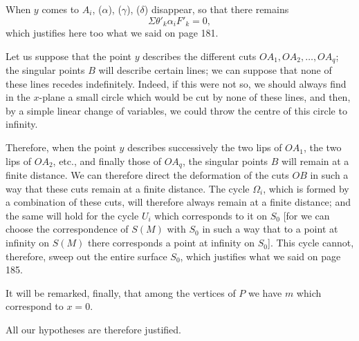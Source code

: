 \documentclass{article}
\begin{document}
When $y$ comes to $A_{i}$, ($\alpha$), ($\gamma$), ($\delta$) disappear, so that there remains
\[ \Sigma \theta'_{k} \alpha_{i}F'_{k} = 0, \]
which justifies here too what we said on page 181.

Let us suppose that the point $y$ describes the different cuts $OA_{1}, OA_{2}, \ldots, OA_{q}$; the singular points $B$ will describe certain lines; we can suppose that none of these lines recedes indefinitely. Indeed, if this were not so, we should always find in the $x$-plane a small circle which would be cut by none of these lines, and then, by a simple linear change of variables, we could throw the centre of this circle to infinity.

Therefore, when the point $y$ describes successively the two lips of $OA_{1}$, the two lips of $OA_{2}$, etc., and finally those of $OA_{q}$, the singular points $B$ will remain at a finite distance. We can therefore direct the deformation of the cuts $OB$ in such a way that these cuts remain at a finite distance. The cycle $\Omega_{i}$, which is formed by a combination of these cuts, will therefore always remain at a finite distance; and the same will hold for the cycle $U_{i}$ which corresponds to it on $S_{0}$ [for we can choose the correspondence of $S(M)$ with $S_{0}$ in such a way that to a point at infinity on $S(M)$ there corresponds a point at infinity on $S_{0}$]. This cycle cannot, therefore, sweep out the entire surface $S_{0}$, which justifies what we said on page 185.

It will be remarked, finally, that among the vertices of $P$ we have $m$ which correspond to $x = 0$.

All our hypotheses are therefore justified.
\end{document}
